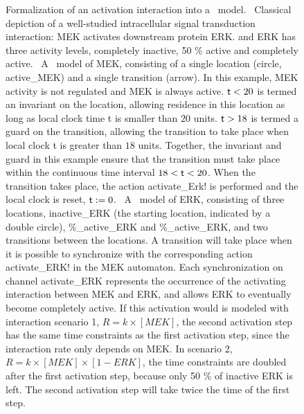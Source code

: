 \begin{figure}[!hb]
\begin{center}
\qquad
{}
\end{center}
\caption{Formalization of an activation interaction into a \tas\ model.
{\bf \protect{}}~Classical depiction of a well-studied intracellular signal transduction 
interaction: MEK activates downstream protein ERK.
and ERK has three activity levels,
completely inactive, 50 \% active and completely active.
{\bf \protect{}}~A \ta\ model of MEK, consisting of a single location (circle, active\_MEK) and 
a single transition (arrow). In this example, MEK activity is not regulated and MEK is always active. ${\sf t} < 20$ 
is termed an invariant on the location, allowing residence in this location as long as local
clock time {\sf t} is smaller than $20$ units. ${\sf t} > 18$ is termed a guard on the transition, allowing the
transition to take place when local clock {\sf t} is greater than $18$ units. Together, the invariant and guard in this
example ensure that the transition must take place within the continuous time interval $18 < {\sf t} < 20$. When the
transition takes place, the action {\sf activate\_Erk!} is performed and the local clock is reset, ${\sf t} := 0$.
{\bf \protect{}}~A \ta\ model of ERK, consisting of three locations, {\sf inactive\_ERK}
(the starting location, indicated by a double circle), {\%\_active\_ERK} and {\%\_active\_ERK},
and two transitions between the locations. A transition will take place when it is possible to synchronize with
the corresponding action {\sf activate\_ERK!} in the MEK automaton.
Each synchronization on channel {\sf activate\_ERK} represents the occurrence of the activating
interaction between MEK and ERK, and allows ERK to eventually become completely active. If this activation
would is modeled with interaction scenario 1, $R = k \times [MEK]$, the second activation step has the same time 
constraints as the first activation step, since the interaction rate only depends on MEK. In scenario 2, 
$R = k \times [MEK] \times [1 - ERK]$, the time constraints are doubled after the first activation step, because only
50 \% of inactive ERK is left. The second activation step will take twice the time of the first step.
}\label{fig:abstraction-mek-erk}
\end{figure}





